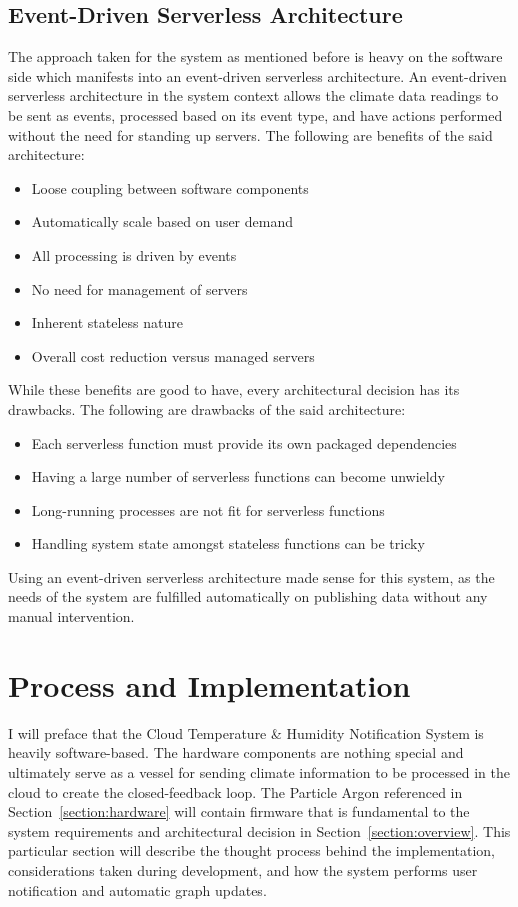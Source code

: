 \documentclass{article}
\begin{document}
\subsection{Event-Driven Serverless Architecture}
The approach taken for the system as mentioned before is heavy on the software side which manifests into an event-driven serverless architecture. An event-driven serverless architecture in the system context allows the climate data readings to be sent as events, processed based on its event type, and have actions performed without the need for standing up servers. The following are benefits of the said architecture:

\begin{itemize}
    \item Loose coupling between software components
    \item Automatically scale based on user demand
    \item All processing is driven by events
    \item No need for management of servers
    \item Inherent stateless nature
    \item Overall cost reduction versus managed servers
\end{itemize}

While these benefits are good to have, every architectural decision has its drawbacks. The following  are drawbacks of the said architecture:

\begin{itemize}
    \item Each serverless function must provide its own packaged dependencies
    \item Having a large number of serverless functions can become unwieldy
    \item Long-running processes are not fit for serverless functions
    \item Handling system state amongst stateless functions can be tricky
\end{itemize}

Using an event-driven serverless architecture made sense for this system, as the needs of the system are fulfilled automatically on publishing data without any manual intervention.

\section{Process and Implementation}
I will preface that the Cloud Temperature \& Humidity Notification System is heavily software-based. The hardware components are nothing special and ultimately serve as a vessel for sending climate information to be processed in the cloud to create the closed-feedback loop. The Particle Argon referenced in Section~\ref{section:hardware} will contain firmware that is fundamental to the system requirements and architectural decision in Section~\ref{section:overview}. This particular section will describe the thought process behind the implementation, considerations taken during development, and how the system performs user notification and automatic graph updates.
\end{document}
